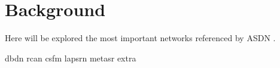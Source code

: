 \section{Background}

Here will be explored the most important networks referenced by ASDN \cite{ASDN}.

{dbdn}
\clearpage
{rcan}
\clearpage
{csfm}
\clearpage
{lapsrn}
\clearpage
{metasr}
\clearpage
{extra}
